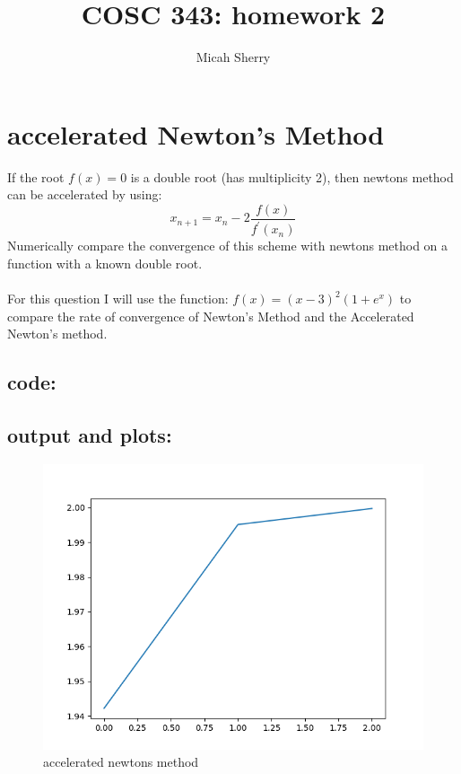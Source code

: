\documentclass{article}
\title{COSC 343: homework 2}
\author{Micah Sherry}
\begin{document}
\maketitle

\section{accelerated Newton's Method}
If the root $f(x) = 0$ is a double root (has multiplicity 2), then newtons method can be accelerated by using:
$$x_{n+1}= x_n - 2\frac{f(x)}{f^\prime(x_n)}$$
Numerically compare the convergence of this scheme with newtons method on a function with a known double root.
\\\\
For this question I will use the function: $f(x) = (x - 3)^2(1 + e^x)$ to compare the rate of convergence of Newton's Method and the Accelerated Newton's method.
\subsection*{code:}

\subsection*{output and plots:}
	\begin{figure}[hbt!]
		\centering
		\includegraphics[width=.75\linewidth]{accelerated_alpha.png}
		\caption{accelerated newtons method}
		\label{fig: accelerated newtons method convergence}
	\end{figure}
	
\end{document}
